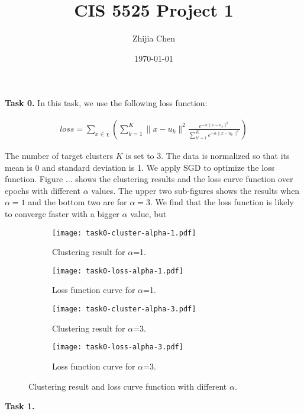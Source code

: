 \documentclass{article}
\title{CIS 5525 Project 1}
\author{Zhijia Chen}
\date{\today}
\begin{document}
\begin{titlepage}
    \maketitle
\end{titlepage}

\textbf{Task 0.}
\vspace{\baselineskip}
In this task, we use the following loss function:

\begin{align*}
    loss = \sum_{x\in \chi}{\left(\sum_{k=1}^{K}\|x-u_k\|^2\frac{e^{-\alpha\|x-u_k\|^2}}{\sum_{k'=1}^{K}e^{-\alpha\|x-u_{k'}\|^2}}\right)}
\end{align*}

The number of target clusters $K$ is set to 3. The data is normalized so that its mean is 0 and standard deviation is 1. We apply SGD to optimize the loss function. Figure ... shows the clustering results and the loss curve function over epochs with different $\alpha$ values. The upper two sub-figures shows the results when $\alpha=1$ and the bottom two are for $\alpha=3$. We find that the loss function is likely to converge faster with a bigger $\alpha$ value, but 
\begin{figure}[h!]
    \centering
    \begin{subfigure}{.33\textwidth}
      \centering
      \texttt{[image: task0-cluster-alpha-1.pdf]}
      \caption{Clustering result for $\alpha$=1.}
      \label{fig:cluster3}
    \end{subfigure}%
    \begin{subfigure}{.66\textwidth}
      \centering
      \texttt{[image: task0-loss-alpha-1.pdf]}
      \caption{Loss function curve for $\alpha$=1.}
      \label{fig:loss3}
    \end{subfigure}
    \centering
    \begin{subfigure}{.33\textwidth}
      \centering
      \texttt{[image: task0-cluster-alpha-3.pdf]}
      \caption{Clustering result for $\alpha$=3.}
      \label{fig:cluster3}
    \end{subfigure}%
    \begin{subfigure}{.66\textwidth}
      \centering
      \texttt{[image: task0-loss-alpha-3.pdf]}
      \caption{Loss function curve for $\alpha$=3.}
      \label{fig:loss3}
    \end{subfigure}
    \caption{Clustering result and loss curve function with different $\alpha$.}
    \label{task0}
\end{figure}

\textbf{Task 1.}
\vspace{\baselineskip}
\end{document}
